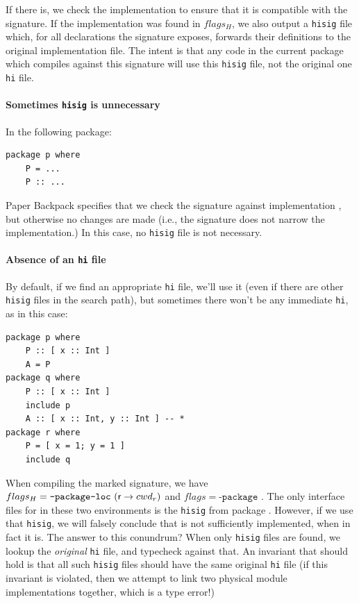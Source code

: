 \documentclass{article}
\begin{document}
If there is, we check the implementation to ensure that it is compatible
with the signature. If the implementation was found in $flags_H$, we
also output a \texttt{hisig} file which, for all declarations the
signature exposes, forwards their definitions to the original
implementation file.  The intent is that any code in the current package
which compiles against this signature will use this \texttt{hisig} file,
not the original one \texttt{hi} file.

\paragraph{Sometimes \texttt{hisig} is unnecessary}
In the following package:

\begin{verbatim}
package p where
    P = ...
    P :: ...
\end{verbatim}

Paper Backpack specifies that we check the signature  against implementation
, but otherwise no changes are made (i.e., the signature does not narrow
the implementation.) In this case, no \texttt{hisig} file is not necessary.

\paragraph{Absence of an \texttt{hi} file}
By default, if we find an appropriate \texttt{hi} file, we'll use it
(even if there are other \texttt{hisig} files in the search path), but
sometimes there won't be any immediate \texttt{hi}, as in this case:

\begin{verbatim}
package p where
    P :: [ x :: Int ]
    A = P
package q where
    P :: [ x :: Int ]
    include p
    A :: [ x :: Int, y :: Int ] -- *
package r where
    P = [ x = 1; y = 1 ]
    include q
\end{verbatim}

When compiling the marked signature, we have $flags_H =
\texttt{-package-loc}\ (\textsf{r} \to cwd_r)$ and $flags =
\texttt{-package}$ .  The
only interface files for  in these two environments is the
\texttt{hisig} from package .  However, if we use that
\texttt{hisig}, we will falsely conclude that  is not sufficiently
implemented, when in fact it is.  The answer to this conundrum? When
only \texttt{hisig} files are found, we lookup the \emph{original}
\texttt{hi} file, and typecheck against that.  An invariant that should
hold is that all such \texttt{hisig} files should have the same original
\texttt{hi} file (if this invariant is violated, then we attempt to link
two physical module implementations together, which is a type error!)
\end{document}
